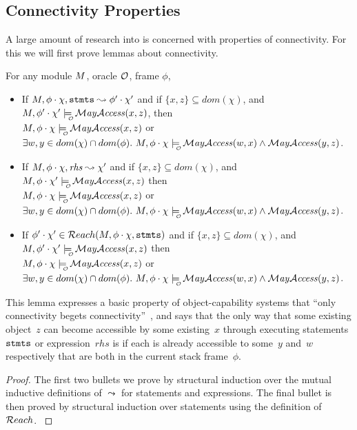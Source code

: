 \subsection{Connectivity Properties}

A large amount of research into is concerned with properties of connectivity. For this we will first prove lemmas about connectivity.

\begin{lemma} For any module $M$, oracle ${\cal O}$, frame $\phi$,
\label{lemma:connectivity-existing}\ \\
\begin{itemize}
\item  {If $M, \phi \cdot \chi, {\textrm{\ttfamily{stmts}}} \leadsto \phi' \cdot \chi'$ and if $\{x,z\}\subseteq dom(\chi)$, and
$\M, \phi' \cdot \chi' \modelsWithO   \MayAccess(x,z)$,  then\\
$\M, \phi \cdot \chi  \modelsWithO   \MayAccess(x,z)$ or
$\exists w, y\in dom(\chi) \cap dom(\phi).\
\M, \phi \cdot \chi \modelsWithO   \MayAccess(w,x) \land \MayAccess(y,z)$.}

\item {If $M, \phi \cdot \chi, \mathit{rhs} \leadsto \chi'$ and if
$\{x,z\}\subseteq dom(\chi)$, and
$\M, \phi \cdot \chi' \modelsWithO   \MayAccess(x,z)$ then\\
$\M, \phi \cdot \chi  \modelsWithO   \MayAccess(x,z)$ or
$\exists w, y\in dom(\chi) \cap dom(\phi).\
\M, \phi \cdot \chi \modelsWithO   \MayAccess(w,x) \land \MayAccess(y,z)$.}

\item {If $\phi' \cdot \chi' \in {\mathcal{R}each}(M,\phi \cdot \chi,{{\textrm{\ttfamily{stmts}}}})$
and if $\{x,z\} \subseteq dom(\chi)$, and
$\M, \phi' \cdot \chi' \modelsWithO   \MayAccess(x,z)$ then\\
$\M, \phi \cdot \chi  \modelsWithO   \MayAccess(x,z)$ or
$\exists w, y\in dom(\chi) \cap dom(\phi).\
\M, \phi \cdot \chi \modelsWithO   \MayAccess(w,x) \land \MayAccess(y,z)$.}

\end{itemize}
\end{lemma}

This lemma expresses a basic property of object-capability
systems that ``only connectivity begets connectivity''~\cite{MillerPhD},
{and says that the only way that some existing object~$z$ can become
accessible by some existing~$x$
through executing statements ${\textrm{\ttfamily{stmts}}}$ or expression~$\mathit{rhs}$
is if each is already accessible to some~$y$ and~$w$ respectively that are
both in the current stack frame~$\phi$.}
\begin{proof}
{
The first two bullets we prove
by structural induction over the mutual inductive definitions of $\leadsto$
for statements and expressions. The final bullet is then proved by
structural induction over statements using the definition of ${\mathcal{R}each}$.
}
\end{proof}

